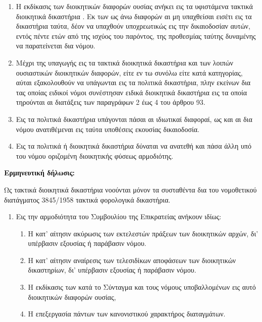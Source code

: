 \documentclass[twoside, a4paper, 10pt]{article}
\begin{document}
\begin{multicols}{2}
\begin{enumerate}
\begin{BigQuote}
\begin{enumerate}
  \item[1.] Η εκδίκασις των διοικητικών διαφορών ουσίας ανήκει εις τα υφιστάμενα τακτικά διοικητικά δικαστήρια . Εκ των ως άνω διαφορών αι μη υπαχθείσαι εισέτι εις τα δικαστήρια ταύτα, δέον να υπαχθούν υποχρεωτικώς εις την δικαιοδοσίαν αυτών, εντός πέντε ετών από της ισχύος του παρόντος, της προθεσμίας ταύτης δυναμένης να παρατείνεται δια νόμου.
  \item[2.] Μέχρι της υπαγωγής εις τα τακτικά διοικητικά δικαστήρια και των λοιπών ουσιαστικών διοικητικών διαφορών, είτε εν τω συνόλω είτε κατά κατηγορίας, αύται εξακολουθούν να υπάγωνται εις τα πολιτικά δικαστήρια, πλην εκείνων δια τας οποίας ειδικοί νόμοι συνέστησαν ειδικά διοικητικά δικαστήρια εις τα οποία τηρούνται αι διατάξεις των παραγράφων 2 έως 4 του άρθρου 93.
  \item[3.] Εις τα πολιτικά δικαστήρια υπάγονται πάσαι αι ιδιωτικαί διαφοραί, ως και αι δια νόμου ανατιθέμεναι εις ταύτα υποθέσεις εκουσίας δικαιοδοσία.
  \item[4.] Εις τα πολιτικά ή διοικητικά δικαστήρια δύναται να ανατεθή και πάσα άλλη υπό του νόμου οριζομένη διοικητικής φύσεως αρμοδιότης.
\end{enumerate}
\textbf{Ερμηνευτική δήλωσις:}

Ως τακτικά διοικητικά δικαστήρια νοούνται μόνον τα συσταθέντα δια του νομοθετικού διατάγματος 3845/1958 τακτικά φορολογικά δικαστήρια.

\begin{enumerate}
  \item[1.] Εις την αρμοδιότητα του Συμβουλίου της Επικρατείας ανήκουν ιδίως:
  \begin{enumerate}
  	\item[α)] Η κατ' αίτησιν ακύρωσις των εκτελεστών πράξεων των διοικητικών αρχών, δι' υπέρβασιν εξουσίας ή παράβασιν νόμου.
  	\item[β)] Η κατ' αίτησιν αναίρεσις των τελεσιδίκων αποφάσεων των διοικητικών δικαστηρίων, δι' υπέρβασιν εξουσίας ή παράβασιν νόμου.
  	\item[γ)] Η εκδίκασις των κατά το Σύνταγμα και τους νόμους υποβαλλομένων εις αυτό διοικητικών διαφορών ουσίας,
  	\item[δ)] Η επεξεργασία πάντων των κανονιστικού χαρακτήρος διαταγμάτων.
  \end{enumerate}


\end{enumerate}
\end{BigQuote}
\end{enumerate}
\end{multicols}
\end{document}
